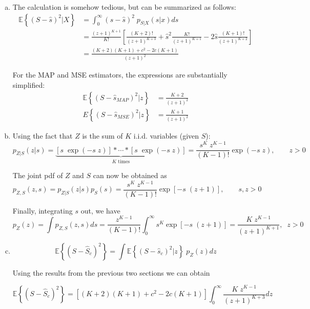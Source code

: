 \begin{solution}[\textcolor{blue}{Solution to problem 2.8}]
\begin{enumerate}[a)]
    \item The calculation is somehow tedious, but can be summarized as follows:
    \begin{align}
        \mathbb{E}\left\{ (S-\hat{s})^2|X\right\} & = \int_0^\infty (s-\hat{s})^2 \; p_{S|X}(s|x) ds \nonumber \\
        & = \frac{(z+1)^{K+1}}{K!}\left[ \frac{(K+2) !}{(z+1)^{K+3}} + \hat{s}^2 \frac{K!}{(z+1)^{K+1}} - 2\hat{s} \frac{(K+1) !}{(z+1)^{K+2}}\right] \nonumber \\
        & = \frac{(K+2)(K+1) + c^2 - 2 c(K+1)}{(z+1)^2} \nonumber
    \end{align}
    
    For the MAP and MSE estimators, the expressions are substantially simplified:
    \begin{align}
        \mathbb{E}\left\{ (S-\hat{s}_{MAP})^2|z\right\} & = \displaystyle\frac{K+2}{(z+1)^2} \nonumber \\
        {E}\left\{(S-\hat{s}_{MSE})^2|z\right\} & = \displaystyle\frac{K+1}{(z+1)^2} \nonumber 
    \end{align}
    
    \item Using the fact that $Z$ is the sum of $K$ i.i.d. variables (given $S$):
    $$p_{Z|S}(z|s) = \underbrace{[s\; \exp(-s\;z)]\ast \cdots \ast[s\; \exp(-s\;z)]}_\text{$K$ times} = \frac{s^{K}\;z^{K-1}}{(K-1)!} \exp(-s \; z), \qquad z>0$$
    
    The joint pdf of $Z$ and $S$ can now be obtained as
    $$p_{Z,S}(z,s) = p_{Z|S}(z|s)p_S(s) = \frac{s^{K}\;z^{K-1}}{(K-1) !} \exp[-s \; (z+1)], \qquad s,z>0$$
    
    Finally, integrating $s$ out, we have
    $$p_Z(z) = \int p_{Z,S}(z,s) ds = \frac{z^{K-1}}{(K-1) !}\int_0^\infty s^K \exp[-s \; (z+1)] = \frac{K\;z^{K-1}}{(z+1)^{K+1}},\;\; z>0$$
    
    \item
    $$\mathbb{E}\left\{ (S-\hat{S}_c)^2\right\} = \int \mathbb{E}\left\{ (S-\hat{s}_c)^2|z\right\} \; p_Z(z) dz$$
    
    Using the results from the previous two sections we can obtain
    
    $$\mathbb{E}\left\{ (S-\hat{S}_c)^2\right\} = \left[(K+2)(K+1) + c^2 - 2 c(K+1)\right] \int_0^\infty \frac{K\;z^{K-1}}{(z+1)^{K+3}} dz$$
    
    
%        
        

\end{enumerate}
\end{solution}
